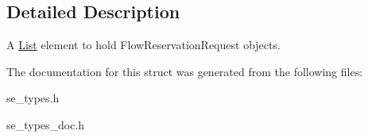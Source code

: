 \subsection{Detailed Description}
A \hyperlink{structList}{List} element to hold Flow\+Reservation\+Request objects. 

The documentation for this struct was generated from the following files\+:\begin{DoxyCompactItemize}
\item 
se\+\_\+types.\+h\item 
se\+\_\+types\+\_\+doc.\+h\end{DoxyCompactItemize}
